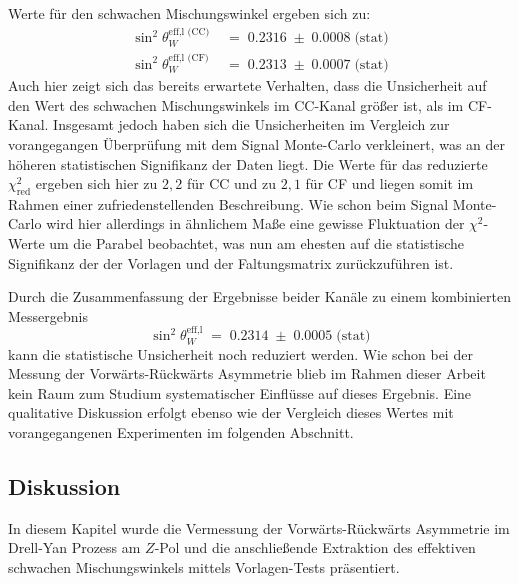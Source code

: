 Werte für den schwachen Mischungswinkel ergeben sich zu:
\begin{align*}
    \sin^2\theta_W^\text{eff,l (CC)} &\;=\; 0.2316
        \;\pm\; 0.0008 \;\text{(stat)}
    \\[5pt]
    \sin^2\theta_W^\text{eff,l (CF)} &\;=\; 0.2313
        \;\pm\; 0.0007 \;\text{(stat)}
\end{align*}
Auch hier zeigt sich das bereits erwartete Verhalten, dass die Unsicherheit auf
den Wert des schwachen Mischungswinkels im \ac{CC}-Kanal größer ist, als im
\ac{CF}-Kanal. Insgesamt jedoch haben sich die Unsicherheiten im Vergleich zur
vorangegangen Überprüfung mit dem Signal Monte-Carlo verkleinert, was an der
höheren statistischen Signifikanz der Daten liegt. Die Werte für das reduzierte
$\chi^2_\text{red}$ ergeben sich hier zu $2,2$ für \ac{CC} und zu $2,1$ für
\ac{CF} und liegen somit im Rahmen einer zufriedenstellenden Beschreibung.
Wie schon beim Signal Monte-Carlo wird hier allerdings in ähnlichem Maße eine
gewisse Fluktuation der $\chi^2$-Werte um die Parabel beobachtet, was nun am
ehesten auf die statistische Signifikanz der der Vorlagen und der
Faltungsmatrix zurückzuführen ist.

Durch die Zusammenfassung der Ergebnisse beider Kanäle zu einem kombinierten
Messergebnis 
\begin{equation}
    \sin^2\theta_W^\text{eff,l} \;=\; 0.2314
        \;\pm\; 0.0005 \;\text{(stat)}
\end{equation}
kann die statistische Unsicherheit noch reduziert werden. Wie schon bei der
Messung der Vorwärts-Rückwärts Asymmetrie blieb im Rahmen dieser Arbeit kein
Raum zum Studium systematischer Einflüsse auf dieses Ergebnis. Eine qualitative
Diskussion erfolgt ebenso wie der Vergleich dieses Wertes mit vorangegangenen
Experimenten im folgenden Abschnitt.



\subsection{Diskussion}
\label{afb:diskussion}

In diesem Kapitel wurde die Vermessung der Vorwärts-Rückwärts Asymmetrie im
Drell-Yan Prozess am $Z$-Pol und die anschließende Extraktion des effektiven
schwachen Mischungswinkels mittels Vorlagen-Tests präsentiert.

